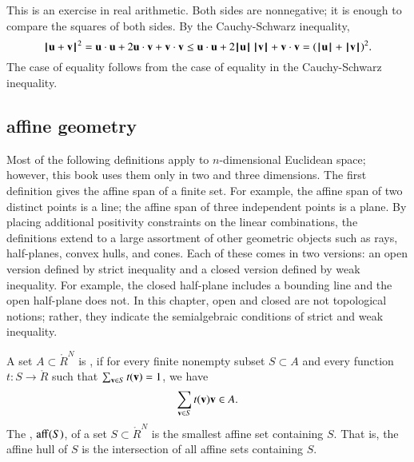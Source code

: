 \begin{proved}  This is an exercise in real arithmetic.
Both sides are nonnegative; it is enough to compare the squares of
both sides.  By the Cauchy-Schwarz inequality,
\[ {{\hskip0.1em|\hskip-0.15em|\hskip0.1em}{\mathbf u} + {\mathbf v}{\hskip0.1em|\hskip-0.15em|\hskip0.1em}}^2 = {\mathbf u}\cdot {\mathbf u} + 2 {\mathbf u}\cdot {\mathbf v} + {\mathbf v}\cdot {\mathbf v} \le
  {\mathbf u}\cdot {\mathbf u} + 2 {{\hskip0.1em|\hskip-0.15em|\hskip0.1em} {\mathbf u}{\hskip0.1em|\hskip-0.15em|\hskip0.1em}}\,{{\hskip0.1em|\hskip-0.15em|\hskip0.1em}{\mathbf v}{\hskip0.1em|\hskip-0.15em|\hskip0.1em}} + {\mathbf v}\cdot {\mathbf v} = ({{\hskip0.1em|\hskip-0.15em|\hskip0.1em}{\mathbf u}{\hskip0.1em|\hskip-0.15em|\hskip0.1em}}+{{\hskip0.1em|\hskip-0.15em|\hskip0.1em}{\mathbf v}{\hskip0.1em|\hskip-0.15em|\hskip0.1em}})^2.
\] 
The case of equality follows from the case of equality in the
Cauchy-Schwarz inequality.
\swallowed\end{proved}



\subsection{affine geometry}




Most of the following definitions apply to
  $n$-dimensional Euclidean space; however, this book uses them only
  in two and three dimensions.  The first definition gives the affine
  span of a finite set.  For example, the affine span of two distinct
  points is a line; the affine span of three independent points is a
  plane.  By placing additional positivity constraints on the linear
  combinations, the definitions extend to a large assortment of other
  geometric objects such as rays, half-planes, convex hulls, and
  cones.  Each of these comes in two versions: an open version defined
  by strict inequality and a closed version defined by weak
  inequality.  For example, the closed half-plane includes a bounding
  line and the open half-plane does not.  In this chapter, open and
  closed are not topological notions; rather, they indicate the
  semialgebraic conditions of strict and weak inequality.


\begin{definition}
A set $A\subset\ring{R}^N$ is , if for
every finite nonempty subset $S\subset A$ and every function $t:S\to\ring{R}$ such that $\sum _{{\mathbf v}\in S} t({\mathbf v})=1$, we have
\[ 
 \sum_{\v\in S} t(\v) \v \in A.  %
\] 
The , ${\operatorname{aff}}(S)$, of a set $S\subset\ring{R}^N$ is the smallest affine set
containing $S$. 
That is, the affine hull of $S$ is the intersection of all affine
sets containing $S$. 
\end{definition}


